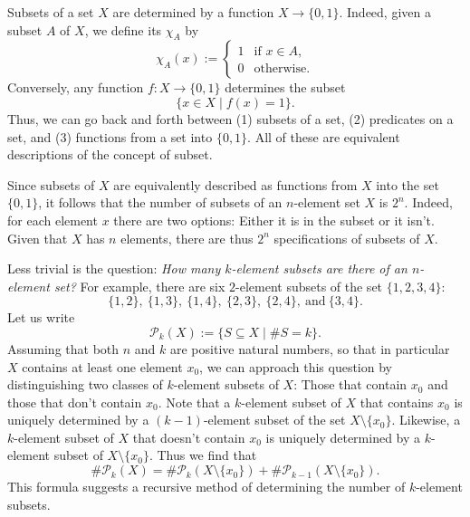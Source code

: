 Subsets of a set $X$ are determined by a function $X\to \{0,1\}$. Indeed, given a subset $A$ of $X$, we define its  $\chi_A$ by
\begin{equation*}
  \chi_A(x):=
  \begin{cases}
    1 & \text{if $x\in A$}, \\
    0 & \text{otherwise}.
  \end{cases}
\end{equation*}
Conversely, any function $f:X\to \{0,1\}$ determines the subset
\begin{equation*}
  \{x\in X\mid f(x)=1\}.
\end{equation*}
Thus, we can go back and forth between (1) subsets of a set, (2) predicates on a set, and (3) functions from a set into $\{0,1\}$. All of these are equivalent descriptions of the concept of subset.

Since subsets of $X$ are equivalently described as functions from $X$ into the set $\{0,1\}$, it follows that the number of subsets of an $n$-element set $X$ is $2^n$. Indeed, for each element $x$ there are two options: Either it is in the subset or it isn't. Given that $X$ has $n$ elements, there are thus $2^n$ specifications of subsets of $X$.

Less trivial is the question: \emph{How many $k$-element subsets are there of an $n$-element set?} For example, there are six $2$-element subsets of the set $\{1,2,3,4\}$:
\begin{equation*}
  \{1,2\},~\{1,3\},~\{1,4\},~\{2,3\},~\{2,4\},~\text{and}~\{3,4\}.
\end{equation*}
Let us write
\begin{equation*}
  \mathcal{P}_k(X):=\{S\subseteq X\mid \# S=k\}.
\end{equation*}
Assuming that both $n$ and $k$ are positive natural numbers, so that in particular $X$ contains at least one element $x_0$, we can approach this question by distinguishing two classes of $k$-element subsets of $X$: Those that contain $x_0$ and those that don't contain $x_0$. Note that a $k$-element subset of $X$ that contains $x_0$ is uniquely determined by a $(k-1)$-element subset of the set $X\setminus\{x_0\}$. Likewise, a $k$-element subset of $X$ that doesn't contain $x_0$ is uniquely determined by a $k$-element subset of $X\setminus\{x_0\}$. Thus we find that
\begin{equation*}
  \#\mathcal{P}_k(X)=\#\mathcal{P}_k(X\setminus\{x_0\})+\#\mathcal{P}_{k-1}(X\setminus\{x_0\}).
\end{equation*}
This formula suggests a recursive method of determining the number of $k$-element subsets.


